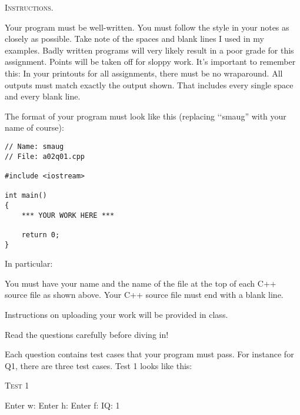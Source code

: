 
\textsc{Instructions.}
\begin{enumerate}
\li Your program must be well-written. 
    You must follow the style in your notes as closely as possible. 
    Take note of the spaces and blank lines I used in my examples. 
    Badly written programs will very likely result in a poor grade for this 
    assignment. 
    Points will be taken off for sloppy work. 
\li It's important to remember this: In your printouts for all assignments, 
    there must be no wraparound.
\li All outputs must match exactly the output shown. 
    That includes every single space and every blank line.

\li The format of your program must look like this
(replacing \lq\lq smaug'' with your name of course):
\begin{Verbatim}[frame=single,fontsize=\small]
// Name: smaug
// File: a02q01.cpp

#include <iostream>

int main()
{
    *** YOUR WORK HERE ***

    return 0;
}
\end{Verbatim}
In particular:
\begin{enumerate}
\li You must have your name and the name of the file at the top of each 
    C++ source file as shown above.
\li Your C++ source file must end with a blank line.
\end{enumerate}

\li Instructions on uploading your work will be provided in class.

\end{enumerate}

Read the questions carefully before diving in!

Each question contains test cases that your program must pass. For instance for Q1, there are three test cases. Test 1 looks like this:

\textsc{Test 1}
\begin{console}[commandchars=\\\{\}]
Enter w: 
Enter h: 
Enter f: 
IQ: 1
\end{console}

